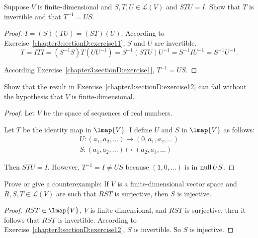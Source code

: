 \begin{exercise}\label{chapter3:sectionD:exercise12}
    Suppose $V$ is finite-dimensional and $S, T, U \in \mathcal{L}(V)$ and $STU = I$. Show that $T$ is invertible and that $T^{-1} = US$.
\end{exercise}

\begin{proof}
    $I = (S)(TU) = (ST)(U)$. According to Exercise~\ref{chapter3:sectionD:exercise11}, $S$ and $U$ are invertible.
    \[
        T = ITI = (S^{-1}S)T(UU^{-1}) = S^{-1}(STU)U^{-1} = S^{-1}IU^{-1} = S^{-1}U^{-1}.
    \]

    According Exercise~\ref{chapter3:sectionD:exercise1}, $T^{-1} = US$.
\end{proof}
\newpage

\begin{exercise}
    Show that the result in Exercise~\ref{chapter3:sectionD:exercise12} can fail without the hypothesis that $V$ is finite-dimensional.
\end{exercise}

\begin{proof}
    Let $V$ be the space of sequences of real numbers.

    Let $T$ be the identity map in $\lmap{V}$. I define $U$ and $S$ in $\lmap{V}$ as follows:
    \[
        \begin{split}
            U: (a_{1}, a_{2}, \ldots) \mapsto (0, a_{1}, a_{2}, \ldots) \\
            S: (a_{1}, a_{2}, \ldots) \mapsto (a_{2}, a_{3}, \ldots)
        \end{split}
    \]

    Then $STU = I$. However, $T^{-1} = I\ne US$ because $(1, 0, \ldots)$ is in $\text{null}\,{US}$.
\end{proof}
\newpage

\begin{exercise}
    Prove or give a counterexample: If $V$ is a finite-dimensional vector space
    and $R, S, T \in \mathcal{L}(V)$ are such that $RST$ is surjective, then $S$ is injective.
\end{exercise}

\begin{proof}
    $RST\in\lmap{V}$, $V$ is finite-dimensional, and $RST$ is surjective, then it follows that $RST$ is invertible. According to Exercise~\ref{chapter3:sectionD:exercise12}, $S$ is invertible. So $S$ is injective.
\end{proof}
\newpage

